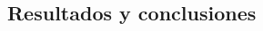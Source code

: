 \documentclass{article}
\begin{document}
\begin{multicols}{2}

\section{Resultados y conclusiones}
\label{sec4}


\end{multicols}
\end{document}
